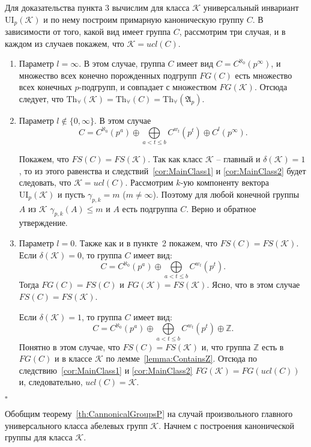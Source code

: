 \documentclass[a4paper,11pt,twoside]{article}
\def\A{{\mathfrak{A}}}
\def\K{{\mathcal{K}}}
\def\Z{{\mathbb{Z}}}
\def\Tha{{\mathrm{Th}_\forall}}
\def\ui{{\mathrm{UI}}}
\begin{document}
Для доказательства пункта 3 вычислим для класса $\K$ универсальный инвариант $\ui_p(\K)$ и по нему построим примарную каноническую группу $C$. В зависимости от того, какой вид имеет группа $C$, рассмотрим три случая, и в каждом из случаев покажем, что $\K = ucl(C)$.
\begin{enumerate}
\item Параметр $l = \infty$. В этом случае, группа $C$ имеет вид $C = C^{\aleph_0} (p^\infty)$, и множество всех конечно порожденных подгрупп $FG(C)$ есть множество всех конечных $p$-подгрупп, и совпадает с множеством $FG(\K)$. Отсюда следует, что $\Tha(\K) = \Tha(C) = \Tha(\A_p)$.

\item Параметр $l \notin \{0, \infty\}$. В этом случае
$$ C = C^{\aleph_0}(p^a) \oplus \bigoplus\limits_{ a < t \leq b} C^{w_t}(p^t) \oplus C^l(p^\infty).$$

Покажем, что $FS(C) = FS(\K)$. Так как класс $\K$ -- главный и $\delta(\K) = 1$, то из этого равенства и следствий~\ref{cor:MainClass1} и \ref{cor:MainClass2} будет следовать, что $\K = ucl(C)$. Рассмотрим $k$-ую компоненту вектора $\ui_p(\K)$ и пусть $\gamma_{p,k} = m$ ($m \neq \infty$). Поэтому для любой конечной группы $A$ из $\K$ $\gamma_{p,k}(A) \leq m$ и $A$ есть подгруппа $C$. Верно и обратное утверждение.

\item Параметр $l = 0$. Также как и в пункте~2 покажем, что $FS(C) = FS(\K)$. Если $\delta(\K) = 0$, то группа $C$ имеет вид:
$$ C = C^{\aleph_0}(p^a) \oplus \bigoplus\limits_{ a < t \leq b} C^{w_t}(p^t).$$
Тогда $FG(C) = FS(C)$ и $FG(\K) = FS(\K)$. Ясно, что в этом случае $FS(C) = FS(\K)$.

Если $\delta(\K) = 1$, то группа $C$ имеет вид:
$$ C = C^{\aleph_0}(p^a) \oplus \bigoplus\limits_{ a < t \leq b} C^{w_t}(p^t) \oplus \Z.$$
Понятно в этом случае, что $FS(C) = FS(\K)$ и, что группа $\Z$ есть в $FG(C)$ и в классе $\K$ по лемме~\ref{lemma:ContainsZ}. Отсюда по следствию~\ref{cor:MainClass1} и \ref{cor:MainClass2} $FG(\K) = FG(ucl(C))$ и, следовательно, $ucl(C) = \K$.
\end{enumerate}
$\square$

Обобщим теорему~\ref{th:CannonicalGroupsP} на случай произвольного главного универсального класса абелевых групп $\K$. Начнем с построения канонической группы для класса $\K$.
\end{document}
